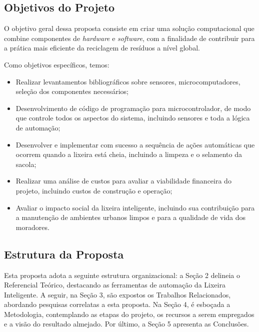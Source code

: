 \subsection{Objetivos do Projeto} \label{sec:objProj}

O objetivo geral dessa proposta consiste em criar uma solução computacional que combine componentes de \textit{hardware} e \textit{software}, com a finalidade de contribuir para a prática mais eficiente da reciclagem de resíduos a nível global.

Como objetivos específicos, temos:

\begin{itemize}
    \item Realizar levantamentos bibliográficos sobre sensores, microcomputadores, seleção dos componentes necessários;
    \item Desenvolvimento de código de programação para microcontrolador, de modo que controle todos os aspectos do sistema, incluindo sensores e toda a lógica de automação;
    \item Desenvolver e implementar com sucesso a sequência de ações automáticas que ocorrem quando a lixeira está cheia, incluindo a limpeza e o selamento da sacola;
    \item Realizar uma análise de custos para avaliar a viabilidade financeira do
projeto, incluindo custos de construção e operação;
    \item Avaliar o impacto social da lixeira inteligente, incluindo sua contribuição para a manutenção de ambientes urbanos limpos e para a qualidade de vida dos moradores.
\end{itemize}

\subsection{Estrutura da Proposta}
Esta proposta adota a seguinte estrutura organizacional: a Seção 2 delineia o Referencial Teórico, destacando as ferramentas de automação da Lixeira Inteligente. A seguir, na Seção 3, são expostos os Trabalhos Relacionados, abordando pesquisas correlatas a esta proposta. Na Seção 4, é esboçada a Metodologia, contemplando as etapas do projeto, os recursos a serem empregados e a visão do resultado almejado. Por último, a Seção 5 apresenta as Conclusões.